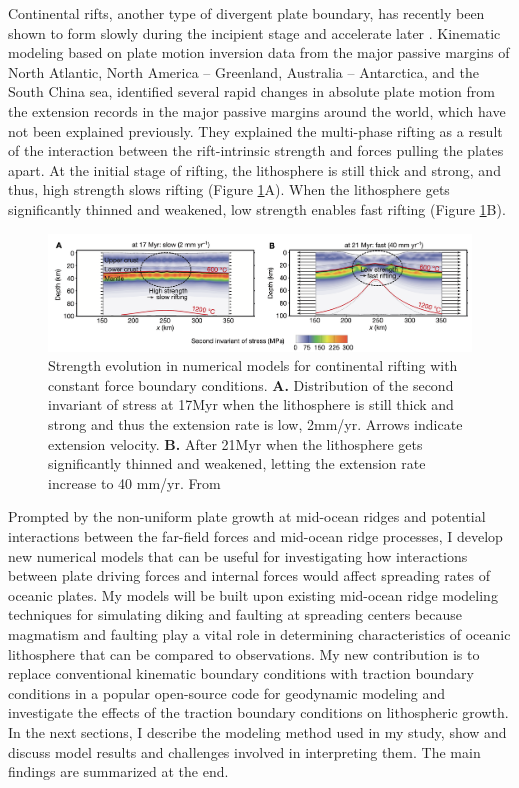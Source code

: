\documentclass[letterpaper,12pt,notitle]{memphisthesis}                     %
\begin{document}
Continental rifts, another type of divergent plate boundary, has recently been shown to form slowly during the incipient stage and accelerate later \citep{Brune2016}. Kinematic modeling based on plate motion inversion data from the major passive margins of North Atlantic, North America – Greenland, Australia – Antarctica, and the South China sea, \citet{Brune2016} identified several rapid changes in absolute plate motion from the extension records in the major passive margins around the world, which have not been explained previously. They explained the multi-phase rifting as a result of the interaction between the rift-intrinsic strength and forces pulling the plates apart. At the initial stage of rifting, the lithosphere is still thick and strong, and thus, high strength slows rifting (Figure \ref{fig:brune}A). When the lithosphere gets significantly thinned and weakened, low strength enables fast rifting (Figure \ref{fig:brune}B).
%
\begin{figure}[!htb]
	\centering
	\includegraphics[width=0.99\linewidth,trim=4 4 4 4,clip]{./figs/brune.png}
	\caption{Strength evolution in numerical models for continental rifting with constant force boundary conditions. \textbf{A.} Distribution of the second invariant of stress at 17Myr when the lithosphere is still thick and strong and thus the extension rate is low, 2mm/yr. Arrows indicate extension velocity. \textbf{B.} After 21Myr when the lithosphere gets significantly thinned and weakened, letting the extension rate increase to 40 mm/yr. From \citet{Brune2016}}
	\label{fig:brune}
\end{figure}

Prompted by the non-uniform plate growth at mid-ocean ridges and potential interactions between the far-field forces and mid-ocean ridge processes, I develop new numerical models that can be useful for investigating how interactions between plate driving forces and internal forces would affect spreading rates of oceanic plates. My models will be built upon existing mid-ocean ridge modeling techniques for simulating diking and faulting at spreading centers because magmatism and faulting play a vital role in determining characteristics of oceanic lithosphere that can be compared to observations. My new contribution is to replace conventional kinematic boundary conditions with traction boundary conditions in a popular open-source code for geodynamic modeling and investigate the effects of the traction boundary conditions on lithospheric growth. In the next sections, I describe the modeling method used in my study, show and discuss model results and challenges involved in interpreting them. The main findings are summarized at the end.
\end{document}
